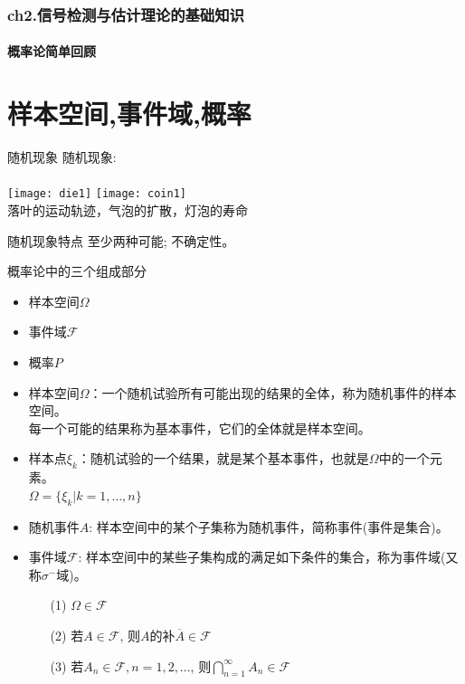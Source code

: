 \begin{frame}[shrink]
\frametitle{ch2.信号检测与估计理论的基础知识}
\framesubtitle{概率论简单回顾}
\tableofcontents[hideallsubsections]
\end{frame}


\section{样本空间,事件域,概率}

\begin{frame}{随机现象}
随机现象:\\
~\\
\texttt{[image: die1]}
\texttt{[image: coin1]}\\
落叶的运动轨迹，气泡的扩散，灯泡的寿命
\begin{block}{随机现象特点}
	至少两种可能; 不确定性。
\end{block}
\end{frame}

\begin{frame}{概率论中的三个组成部分}
\begin{itemize}
	\item 样本空间$\Omega$
	\item 事件域$\mathcal{F}$
	\item 概率$P$
\end{itemize}
\end{frame}

\begin{frame}
\begin{itemize}
	\item 样本空间$\Omega$：一个随机试验所有可能出现的结果的全体，称为随机事件的样本空间。\\
	每一个可能的结果称为基本事件，它们的全体就是样本空间。
	\item 样本点$\xi_k$：随机试验的一个结果，就是某个基本事件，也就是$\Omega$中的一个元素。\\
	$\Omega=\{\xi_k|k=1,\dots,n\}$
	\item 随机事件$A$: 样本空间中的某个子集称为随机事件，简称事件(事件是集合)。
    \item 事件域$\mathcal{F}$: 样本空间中的某些子集构成的满足如下条件的集合，称为事件域(又称$\sigma^-$域)。
	\begin{itemize}
		\item[(1)] $\Omega\in\mathcal{F}$
		\item[(2)] 若$A\in\mathcal{F}$, 则$A$的补$\overline{A}\in\mathcal{F}$
		\item[(3)] 若$A_n\in\mathcal{F}, n=1,2,\dots$, 则$\bigcap\limits_{n=1}^{\infty}A_n\in\mathcal{F}$
	\end{itemize}
\end{itemize}
\end{frame}

